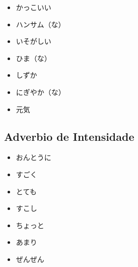 \documentclass[a4paper, 12pt]{article}
\begin{document}
\begin{CJK}{UTF8}{min}
\begin{itemize}
		\item かっこいい
		\item ハンサム（な）\\
		
		\item いそがしい
		\item ひま（な）\\
		
		\item しずか
		\item にぎやか（な）\\
		
		\item 元気
	\end{itemize}
	
\subsection{Adverbio de Intensidade}
	\begin{itemize}
		\item おんとうに
		\item すごく
		\item とても
		\item すこし
		\item ちょっと
		\item あまり
		\item ぜんぜん
	\end{itemize}
\end{CJK}
\end{document}
